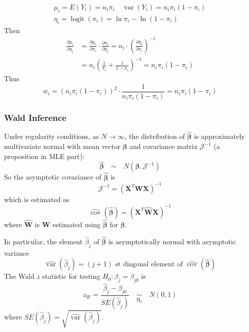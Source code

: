 \documentclass[11pt]{elegantbook}
\begin{document}
\begin{example}
    $$
    \begin{gathered}
    \mu_i=E\left(Y_i\right)=n_i \pi_i \quad \operatorname{var}\left(Y_i\right)=n_i \pi_i\left(1-\pi_i\right) \\
    \eta_i=\operatorname{logit}\left(\pi_i\right)=\ln \pi_i-\ln \left(1-\pi_i\right)
    \end{gathered}
    $$
    Then
    $$
    \begin{aligned}
    \frac{\partial \mu_i}{\partial \eta_i} & =\frac{\partial \mu_i}{\partial \pi_i} \cdot \frac{\partial \pi_i}{\partial \eta_i}=n_i \cdot\left(\frac{\partial \eta_i}{\partial \pi_i}\right)^{-1} \\
    & =n_i\left(\frac{1}{\pi_i}+\frac{1}{1-\pi_i}\right)^{-1}=n_i \pi_i\left(1-\pi_i\right)
    \end{aligned}
    $$
    Thus
    $$
    w_i=\left(n_i \pi_i\left(1-\pi_i\right)\right)^2 \cdot \frac{1}{n_i \pi_i\left(1-\pi_i\right)}=n_i \pi_i\left(1-\pi_i\right)
    $$
\end{example}

\subsubsection{Wald Inference}
Under regularity conditions, as $N \rightarrow \infty$, the distribution of $\hat{\boldsymbol{\beta}}$ is approximately multivariate normal with mean vector $\boldsymbol{\beta}$ and covariance matrix $\boldsymbol{\mathcal{J}}^{-1}$ (a proposition in MLE part):
$$
\hat{\boldsymbol{\beta}}\quad \dot{\sim}\quad N\left(\boldsymbol{\beta}, \boldsymbol{\mathcal{J}}^{-1}\right)
$$
So the asymptotic covariance of $\hat{\boldsymbol{\beta}}$ is
$$
\boldsymbol{\mathcal{J}}^{-1}=\left(\boldsymbol{X}^T \boldsymbol{W} \boldsymbol{X}\right)^{-1}
$$
which is estimated as
$$
\widehat{\operatorname{cov}}(\hat{\boldsymbol{\beta}})=\left(\boldsymbol{X}^T \hat{\boldsymbol{W}} \boldsymbol{X}\right)^{-1}
$$
where $\hat{\boldsymbol{W}}$ is $\boldsymbol{W}$ estimated using $\hat{\boldsymbol{\beta}}$ for $\boldsymbol{\beta}$.

In particular, the element $\hat{\beta}_j$ of $\hat{\boldsymbol{\beta}}$ is asymptotically normal with asymptotic variance
$$
\widehat{\operatorname{var}}\left(\hat{\beta}_j\right)=(j+1) \text { st diagonal element of } \widehat{\operatorname{cov}}(\hat{\boldsymbol{\beta}})
$$
The Wald $z$ statistic for testing $H_0: \beta_j=\beta_{j 0}$ is
$$
z_W=\frac{\hat{\beta}_j-\beta_{j 0}}{S E\left(\hat{\beta}_j\right)}\quad \underset{\mathrm{H}_0}{\dot{\sim}}\quad N(0,1)
$$
where $S E\left(\hat{\beta}_j\right)=\sqrt{\widehat{\operatorname{var}}\left(\hat{\beta}_j\right)}$.
\end{document}
